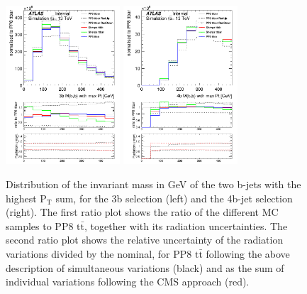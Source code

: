 \begin{figure}[!htb]
\centering
\includegraphics[width=0.38\textwidth]{Plots/ttbb/hisgenEvt_M_HardestGenBJets_4j3t__div}
\includegraphics[width=0.38\textwidth]{Plots/ttbb/hisgenEvt_M_HardestGenBJets_4j4t__div}
  \caption{Distribution of the invariant mass in GeV of the two b-jets with the highest $\mathrm{P_T}$ sum, for the 3b selection (left) and the 4b-jet selection (right). The first ratio plot shows the ratio of the different MC samples to PP8 $\mathrm{t\bar{t}}$, together with its radiation uncertainties. The second ratio plot shows the relative uncertainty of the radiation variations divided by the nominal, for PP8 $\mathrm{t\bar{t}}$ following the above description of simultaneous variations (black) and as the sum of individual variations following the CMS approach (red). \label{ttbb:MbbmaxPT}}
\end{figure}

